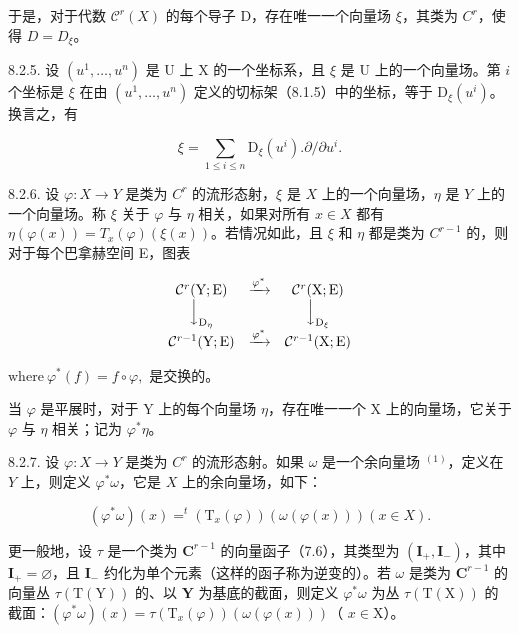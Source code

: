 于是，对于代数 \(\mathcal{C}^r(X)\) 的每个导子 D，存在唯一一个向量场 \(\xi\)，其类为 \(C^r\)，使得 \(D = D_{\xi}\)。

8.2.5. 设 \((u^{1},\ldots ,u^{n})\) 是 U 上 X 的一个坐标系，且 \(\xi\) 是 U 上的一个向量场。第 \(i\) 个坐标是 \(\xi\) 在由 \((u^{1},\ldots ,u^{n})\) 定义的切标架（8.1.5）中的坐标，等于 \(\mathrm{D}_{\xi}(u^i)\)。换言之，有

\[
\xi = \sum_ {1 \leqslant i \leqslant n} \mathrm{D} _ {\xi} (u ^ {i}). \partial / \partial u ^ {i}.
\]

8.2.6. 设 \(\varphi: X \to Y\) 是类为 \(C^r\) 的流形态射，\(\xi\) 是 \(X\) 上的一个向量场，\(\eta\) 是 \(Y\) 上的一个向量场。称 \(\xi\) 关于 \(\varphi\) 与 \(\eta\) 相关，如果对所有 \(x \in X\) 都有 \(\eta(\varphi(x)) = T_x(\varphi)(\xi(x))\)。若情况如此，且 \(\xi\) 和 \(\eta\) 都是类为 \(C^{r-1}\) 的，则对于每个巴拿赫空间 E，图表

\[
\begin{array}{c c c} \mathcal {C} ^ {r} (\mathrm{Y}; \mathrm{E}) & \xrightarrow {\varphi^ {*}} & \mathcal {C} ^ {r} (\mathrm{X}; \mathrm{E}) \\ \Big \downarrow_ {\mathrm{D} _ {\eta}} & & \Big \downarrow_ {\mathrm{D} _ {\xi}} \\ \mathcal {C} ^ {r - 1} (\mathrm{Y}; \mathrm{E}) & \xrightarrow {\varphi^ {*}} & \mathcal {C} ^ {r - 1} (\mathrm{X}; \mathrm{E}) \end{array}
\]

\(\mathrm{where}\ \varphi^{*}(f) = f\circ \varphi ,\) 是交换的。

当 \(\varphi\) 是平展时，对于 Y 上的每个向量场 \(\eta\)，存在唯一一个 X 上的向量场，它关于 \(\varphi\) 与 \(\eta\) 相关；记为 \(\varphi^{*}\eta\)。

8.2.7. 设 \(\varphi: X \to Y\) 是类为 \(C^r\) 的流形态射。如果 \(\omega\) 是一个余向量场 \(^{(1)}\)，定义在 \(Y\) 上，则定义 \(\varphi^*\omega\)，它是 \(X\) 上的余向量场，如下：

\[
(\varphi^ {*} \omega) (x) = ^ {t} (\mathrm{T} _ {x} (\varphi)) (\omega (\varphi (x))) (x \in X).
\]

更一般地，设 \(\tau\) 是一个类为 \(\mathbf{C}^{r-1}\) 的向量函子（7.6），其类型为 \((\mathbf{I}_{+}, \mathbf{I}_{-})\)，其中 \(\mathbf{I}_{+} = \varnothing\)，且 \(\mathbf{I}_{-}\) 约化为单个元素（这样的函子称为逆变的）。若 \(\omega\) 是类为 \(\mathbf{C}^{r-1}\) 的向量丛 \(\tau(\mathrm{T}(\mathrm{Y}))\) 的、以 \(\mathbf{Y}\) 为基底的截面，则定义 \(\varphi^{*}\omega\) 为丛 \(\tau(\mathrm{T}(\mathrm{X}))\) 的截面：\((\varphi^{*}\omega)(x) = \tau(\mathrm{T}_{x}(\varphi))(\omega(\varphi(x)))\)（ \(x \in \mathrm{X}\)）。
